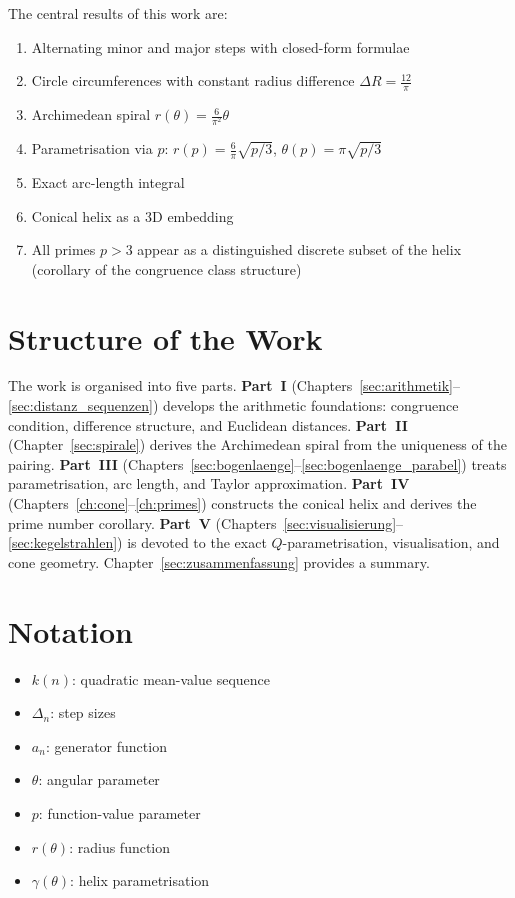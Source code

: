 The central results of this work are:
\begin{enumerate}
\item Alternating minor and major steps with closed-form formulae
\item Circle circumferences with constant radius difference $\Delta R = \frac{12}{\pi}$
\item Archimedean spiral $r(\theta) = \frac{6}{\pi^2}\theta$
\item Parametrisation via $p$: $r(p)=\frac{6}{\pi}\sqrt{p/3}$, $\theta(p)=\pi\sqrt{p/3}$
\item Exact arc-length integral
\item Conical helix as a 3D embedding
\item All primes $p>3$ appear as a distinguished discrete subset of the helix (corollary of the congruence class structure)
\end{enumerate}

\section*{Structure of the Work}

The work is organised into five parts. \textbf{Part~I}
(Chapters~\ref{sec:arithmetik}--\ref{sec:distanz_sequenzen}) develops the
arithmetic foundations: congruence condition, difference structure, and
Euclidean distances. \textbf{Part~II} (Chapter~\ref{sec:spirale}) derives
the Archimedean spiral from the uniqueness of the pairing.
\textbf{Part~III} (Chapters~\ref{sec:bogenlaenge}--\ref{sec:bogenlaenge_parabel})
treats parametrisation, arc length, and Taylor approximation.
\textbf{Part~IV} (Chapters~\ref{ch:cone}--\ref{ch:primes}) constructs the
conical helix and derives the prime number corollary. \textbf{Part~V}
(Chapters~\ref{sec:visualisierung}--\ref{sec:kegelstrahlen}) is devoted to the
exact $Q$-parametrisation, visualisation, and cone geometry.
Chapter~\ref{sec:zusammenfassung} provides a summary.

\section*{Notation}

\begin{itemize}[leftmargin=2em]
\item $k(n)$: quadratic mean-value sequence
\item $\Delta_n$: step sizes
\item $a_n$: generator function
\item $\theta$: angular parameter
\item $p$: function-value parameter
\item $r(\theta)$: radius function
\item $\gamma(\theta)$: helix parametrisation
\end{itemize}
